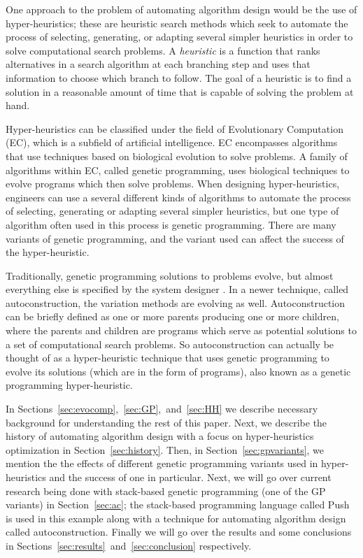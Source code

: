 \documentclass{sig-alternate}
\begin{document}
One approach to the problem of automating algorithm design would be the use of hyper-heuristics; these are heuristic search methods which seek to automate the process of selecting, generating, or adapting several simpler heuristics in order to solve computational search problems. A \textit{heuristic} is a function that ranks alternatives in a search algorithm at each branching step and uses that information to choose which branch to follow. The goal of a heuristic is to find a solution in a reasonable amount of time that is capable of solving the problem at hand.

Hyper-heuristics can be classified under the field of Evolutionary Computation (EC), which is a subfield of artificial intelligence. EC encompasses algorithms that use techniques based on biological evolution to solve problems. A family of algorithms within EC, called genetic programming, uses biological techniques to evolve programs which then solve problems. When designing hyper-heuristics, engineers can use a several different kinds of algorithms to automate the process of selecting, generating or adapting several simpler heuristics, but one type of algorithm often used in this process is genetic programming. There are many variants of genetic programming, and the variant used can affect the success of the hyper-heuristic.

Traditionally, genetic programming solutions to problems evolve, but almost everything else is specified by the system designer \cite{spector:2016}. In a newer technique, called autoconstruction, the variation methods are evolving as well. Autoconstruction can be briefly defined as one or more parents producing one or more children, where the parents and children are programs which serve as potential solutions to a set of computational search problems. So autoconstruction can actually be thought of as a hyper-heuristic technique that uses genetic programming to evolve its solutions (which are in the form of programs), also known as a genetic programming hyper-heuristic.

In Sections~\ref{sec:evocomp},~\ref{sec:GP},~and~\ref{sec:HH} we describe necessary background for understanding the rest of this paper. Next, we describe the history of automating algorithm design with a focus on hyper-heuristics optimization in Section~\ref{sec:history}. Then, in Section~\ref{sec:gpvariants}, we mention the the effects of different genetic programming variants used in hyper-heuristics and the success of one in particular. Next, we will go over current research being done with stack-based genetic programming (one of the GP variants) in Section~\ref{sec:ac}; the stack-based programming language called Push is used in this example along with a technique for automating algorithm design called autoconstruction. Finally we will go over the results and some conclusions in Sections~\ref{sec:results}~and~\ref{sec:conclusion} respectively.
\end{document}
